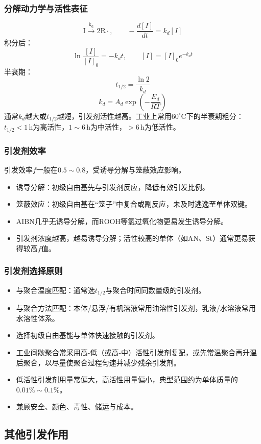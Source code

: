 ﻿\documentclass[12pt,a4paper]{article}
\begin{document}
\subsubsection{分解动力学与活性表征}
\[
\mathrm{I \xrightarrow{k_d} 2R\cdot},\qquad -\frac{d[I]}{dt}=k_d[I]
\]
积分后：
\[
\ln\frac{[I]}{[I]_0}=-k_dt,\qquad [I]=[I]_0e^{-k_dt}
\]
半衰期：
\[
t_{1/2}=\frac{\ln2}{k_d}
\]
\[
k_d=A_d\exp\!\left(-\frac{E_d}{RT}\right)
\]
通常$k_d$越大或$t_{1/2}$越短，引发剂活性越高。工业上常用$60^\circ\mathrm{C}$下的半衰期粗分：$t_{1/2}<1\,\mathrm{h}$为高活性，$1\sim6\,\mathrm{h}$为中活性，$>6\,\mathrm{h}$为低活性。

\subsubsection{引发剂效率}
引发效率$f$一般在$0.5\sim0.8$，受诱导分解与笼蔽效应影响。
\begin{itemize}
  \item 诱导分解：初级自由基先与引发剂反应，降低有效引发比例。
  \item 笼蔽效应：初级自由基在“笼子”中复合或副反应，未及时逃逸至单体双键。
  \item AIBN几乎无诱导分解，而ROOH等氢过氧化物更易发生诱导分解。
  \item 引发剂浓度越高，越易诱导分解；活性较高的单体（如AN、St）通常更易获得较高$f$值。
\end{itemize}

\subsubsection{引发剂选择原则}
\begin{itemize}
  \item 与聚合温度匹配：通常选$t_{1/2}$与聚合时间同数量级的引发剂。
  \item 与聚合方法匹配：本体/悬浮/有机溶液常用油溶性引发剂，乳液/水溶液常用水溶性体系。
  \item 选择初级自由基能与单体快速接触的引发剂。
  \item 工业间歇聚合常采用高-低（或高-中）活性引发剂复配，或先常温聚合再升温后聚合，以尽量使聚合过程匀速并减少残余引发剂。
  \item 低活性引发剂用量常偏大，高活性用量偏小，典型范围约为单体质量的$0.01\%\sim0.1\%$。
  \item 兼顾安全、颜色、毒性、储运与成本。
\end{itemize}

\subsection{其他引发作用}
\end{document}
